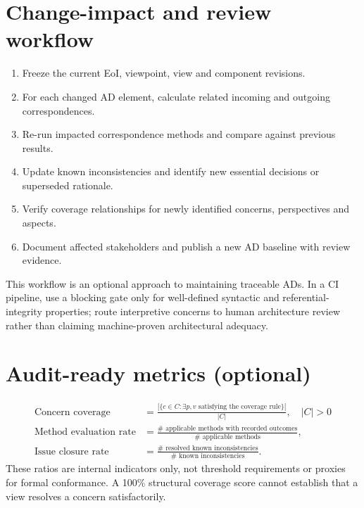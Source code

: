 \documentclass[11pt,letterpaper]{article}
\begin{document}
\section{Change-impact and review workflow}
\begin{enumerate}
\item Freeze the current EoI, viewpoint, view and component revisions.
\item For each changed AD element, calculate related incoming and outgoing correspondences.
\item Re-run impacted correspondence methods and compare against previous results.
\item Update known inconsistencies and identify new essential decisions or superseded rationale.
\item Verify coverage relationships for newly identified concerns, perspectives and aspects.
\item Document affected stakeholders and publish a new AD baseline with review evidence.
\end{enumerate}
\begin{Guidance}This workflow is an optional approach to maintaining traceable ADs. In a CI pipeline, use a blocking gate only for well-defined syntactic and referential-integrity properties; route interpretive concerns to human architecture review rather than claiming machine-proven architectural adequacy.\end{Guidance}
\section{Audit-ready metrics (optional)}
\begin{align*}
\text{Concern coverage} &= \frac{|\{c\in C : \exists p,v\text{ satisfying the coverage rule}\}|}{|C|},\quad |C|>0\\
\text{Method evaluation rate} &= \frac{\#\text{ applicable methods with recorded outcomes}}{\#\text{ applicable methods}},\\
\text{Issue closure rate} &= \frac{\#\text{ resolved known inconsistencies}}{\#\text{ known inconsistencies}}.
\end{align*}
These ratios are internal indicators only, not threshold requirements or proxies for formal conformance. A 100\% structural coverage score cannot establish that a view resolves a concern satisfactorily.
\LegalFooter
\end{document}

